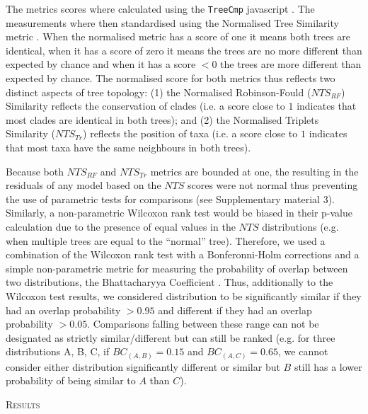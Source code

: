 \documentclass[12pt,letterpaper]{article}
\renewcommand{\section}[1]{%
\bigskip
\begin{center}
\begin{Large}
\normalfont\scshape #1
\medskip
\end{Large}
\end{center}}
\begin{document}
The metrics scores where calculated using the \texttt{TreeCmp} javascript \citep{Bogdanowicz2012}.
The measurements where then standardised using the Normalised Tree Similarity metric \citep[$NTS$; i.e. centering the metrics scores using the mean metric score for 1000 pairwise comparisons between random trees with $n$ taxa;][]{Bogdanowicz2012,Guillerme2016146}.
When the normalised metric has a score of one it means both trees are identical, when it has a score of zero it means the trees are no more different than expected by chance and when it has a score $<0$ the trees are more different than expected by chance.
The normalised score for both metrics thus reflects two distinct aspects of tree topology: (1) the Normalised Robinson-Fould ($NTS_{RF}$) Similarity reflects the conservation of clades (i.e. a score close to $1$ indicates that most clades are identical in both trees); and (2) the Normalised Triplets Similarity ($NTS_{Tr}$) reflects the position of taxa (i.e. a score close to $1$ indicates that most taxa have the same neighbours in both trees).

Because both $NTS_{RF}$ and $NTS_{Tr}$ metrics are bounded at one, the resulting in the residuals of any model based on the $NTS$ scores were not normal thus preventing the use of parametric tests for comparisons (see Supplementary material 3).
Similarly, a non-parametric Wilcoxon rank test \citep{hollander2013nonparametric} would be biased in their p-value calculation due to the presence of equal values in the $NTS$ distributions (e.g. when multiple trees are equal to the ``normal'' tree).
Therefore, we used a combination of the Wilcoxon rank test with a Bonferonni-Holm corrections \citep[to ensure our significant results were robust to Type I error rate inflation;][]{holm1979simple} and a simple non-parametric metric for measuring the probability of overlap between two distributions, the Bhattacharyya Coefficient \citep[$BC$;][]{Bhattacharyya,Guillerme2016146,soto2016trace}.
Thus, additionally to the Wilcoxon test results, we considered distribution to be significantly similar if they had an overlap probability $>0.95$ and different if they had an overlap probability $>0.05$.
Comparisons falling between these range can not be designated as strictly similar/different but can still be ranked (e.g. for three distributions A, B, C, if $BC_{(A,B)} = 0.15$ and $BC_{(A,C)} = 0.65$, we cannot consider either distribution significantly different or similar but $B$ still has a lower probability of being similar to $A$ than $C$).

\section{Results}
\end{document}
